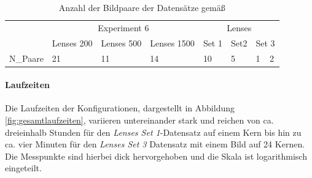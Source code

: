 \begin{table}
	\begin{tabularx}{\textwidth}{@{} XXXXXXXX @{}}
		\toprule
		& \multicolumn{3}{c}{Experiment 6} & \multicolumn{4}{c}{Lenses} \\
		\cmidrule(lr){2-4}
		\cmidrule(lr){5-8}
		& Lenses 200 & Lenses 500 & Lenses 1500 & Set 1 & Set2 & \multicolumn{2}{X}{Set 3} \\
		\hline
		\gls{N_Paare} & 21 & 11 & 14 & 10 & 5 & 1 & 2 \\
		\bottomrule
	\end{tabularx}
	\caption{Anzahl der Bildpaare der Datensätze gemäß \citeauthor{Coj17} \cite{Coj17}}
	\label{tab:datasets}
\end{table}

\paragraph{Laufzeiten}

Die Laufzeiten der Konfigurationen, dargestellt in Abbildung \ref{fig:gesamtlaufzeiten}, variieren untereinander stark und reichen von ca. dreieinhalb Stunden für den \textit{Lenses Set 1}-Datensatz auf einem Kern bis hin zu ca. vier Minuten für den \textit{Lenses Set 3} Datensatz mit einem Bild auf 24 Kernen. Die Messpunkte sind hierbei dick hervorgehoben und die Skala ist logarithmisch eingeteilt. 


